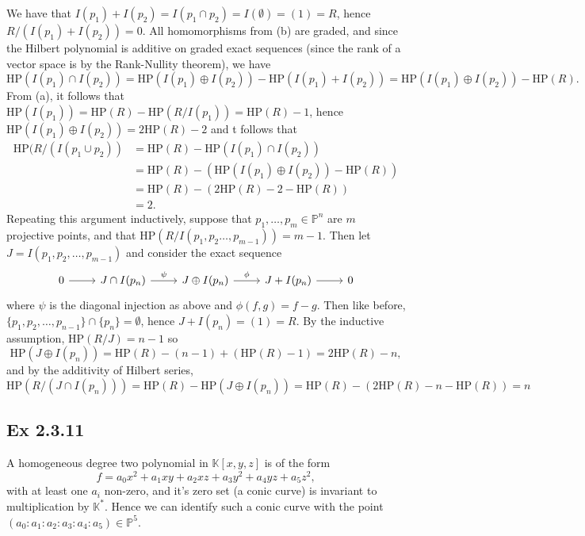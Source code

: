 \documentclass{article}
\theoremstyle{definition}
\newcommand{\K}{\mathbb{K}}
\renewcommand{\P}{\mathbb{P}}
\newcommand{\PP}[1]{\P^{#1}}
\newcommand{\HP}{\text{HP}}
\begin{document}
We have that $I(p_1) + I(p_2) = I(p_1 \cap p_2) = I(\emptyset) = (1) = R$,
hence $R/(I(p_1) + I(p_2)) = 0$. All homomorphisms from (b) are graded, and
since the Hilbert polynomial is additive on graded exact sequences (since the
rank of a vector space is by the Rank-Nullity theorem), we have 
\[
	\HP(I(p_1) \cap I(p_2))
	=
	\HP(I(p_1) \oplus I(p_2))
	-
	\HP(I(p_1) + I(p_2))
	=
	\HP(I(p_1) \oplus I(p_2))
	-
	\HP(R).
\] 
From (a), it follows that $\HP(I(p_1)) = \HP(R) - \HP(R/I(p_1)) = \HP(R) - 1$,
hence $\HP(I(p_1) \oplus I(p_2)) = 2\HP(R) - 2$ and
t follows that
\begin{align*}
	\HP(R/(I(p_1 \cup p_2))
	&=
	\HP(R)
	-
	\HP(I(p_1) \cap I(p_2)) \\
	&=
	\HP(R)
	-
	\left(
		\HP(I(p_1) \oplus I(p_2))
		-
		\HP(R)
	\right) \\
	&=
	\HP(R)
	-
	\left(
		2\HP(R)
		-
		2
		-
		\HP(R)
	\right) \\
	&=
	2.
\end{align*}
Repeating this argument inductively, suppose that $p_1, \ldots, p_m \in \P^{n}$
are $m$ projective points, and that $\HP(R/I(p_1, p_2 \ldots, p_{m - 1})) = m -
1$. Then let $J = I(p_1, p_2, \ldots, p_{m-1})$ and consider the exact sequence 
\[
\begin{tikzcd}
  0 
  \arrow[r] & 
  J \cap I(p_n) 
  \arrow[r, "\psi"] & 
  J \oplus I(p_n) 
  \arrow[r, "\phi"] & 
  J + I(p_n) 
  \ar[r] & 
  0
\end{tikzcd}
\] 
where $\psi$ is the diagonal injection as above and $\phi(f, g) = f - g$.
Then like before, $\{ p_1, p_2, \ldots, p_{n-1} \} \cap \{ p_n \} = \emptyset$,
hence $J + I(p_n) = (1) = R$. By the inductive assumption, 
$\HP(R/J) = n - 1$ so
\[
	\HP(J \oplus I(p_n)) 
	= 
	\HP(R) - (n - 1) 
	+ 
	(\HP(R) - 1)
	=
	2\HP(R) - n,
\]
and by the additivity of Hilbert series, 
\[
	\HP(R/(J \cap I(p_n)))
	=
	\HP(R)
	-
	\HP(J \oplus I(p_n)) 
	=
	\HP(R)
	-
	\left(2\HP(R) - n - \HP(R)\right)
	= 
	n
\] 

\subsection*{Ex 2.3.11}
A homogeneous degree two polynomial in $\K[x, y, z]$ is of the form 
\[
	f = a_0 x^2 + a_1 xy + a_2 xz + a_3 y^2 + a_4 yz + a_5 z^2,
\]
with at least one $a_i$ non-zero, and it's zero set (a conic curve) is
invariant to multiplication by $\K^*$. Hence we can identify such a conic curve
with the point $(a_0 : a_1 : a_2 : a_3 : a_4 : a_5) \in \PP{5}$. \\
\end{document}
